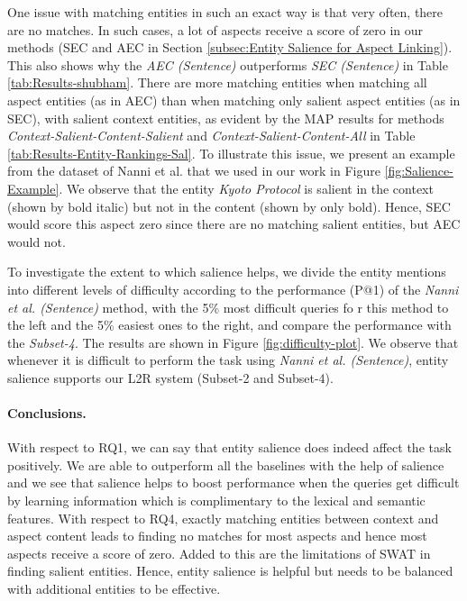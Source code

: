One issue with matching entities in such an exact way is that very often, there are no matches. In such cases, a lot of aspects receive a score of zero in our methods (SEC and AEC in Section \ref{subsec:Entity Salience for Aspect Linking}). This also shows why the \textit{AEC (Sentence)} outperforms  \textit{SEC (Sentence)} in Table \ref{tab:Results-shubham}. There are more matching entities when matching all aspect entities (as in AEC) than when matching only salient aspect entities (as in SEC), with salient context entities, as evident by the MAP results for methods \textit{Context-Salient-Content-Salient} and \textit{Context-Salient-Content-All} in Table \ref{tab:Results-Entity-Rankings-Sal}. To illustrate this issue, we present an example from the dataset of Nanni et al.\cite{nanni2018entity} that we used in our work in Figure \ref{fig:Salience-Example}. We observe that the entity \textit{Kyoto Protocol} is salient in the context (shown by bold italic) but not in the content (shown by only bold). Hence, SEC would score this aspect zero since there are no matching salient entities, but AEC would not.


To investigate the extent to which salience helps, we divide the entity mentions  into different levels of difficulty according to the performance (P@1) of the \textit{Nanni et al. (Sentence)} method, with the 5\% most difficult queries fo
r this method to the left and the 5\% easiest ones to the right, and compare the performance with the \textit{Subset-4}. The results are shown in Figure \ref{fig:difficulty-plot}. We observe that whenever it is difficult to perform the task using \textit{Nanni et al. (Sentence)}, entity salience supports our L2R system (Subset-2 and Subset-4).


\paragraph{\textbf{Conclusions.}}
With respect to RQ1, we can say that entity salience does indeed affect the task positively. We are able to outperform all the baselines with the help of salience and we see that salience helps to boost performance when the queries get difficult by learning information which is complimentary to the lexical and semantic features. With respect to RQ4, exactly matching entities between context and aspect content leads to finding no matches for most aspects and hence most aspects receive a score of zero. Added to this are the limitations of SWAT in finding salient entities. Hence, entity salience is helpful but needs to be balanced with additional entities to be effective. 

